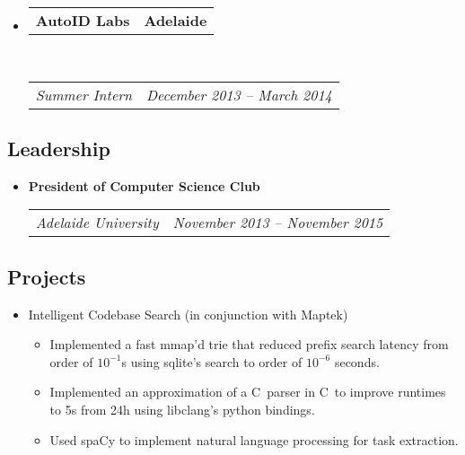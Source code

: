 \documentclass[10pt,letterpaper]{article}
\makeatletter
\newcommand{\headerrow}[2]
{\begin{tabular*}{\linewidth}{l@{\extracolsep{\fill}}r}
  #1 &
  #2 \\
\end{tabular*}}
\newcommand{\CPP}
{C\nolinebreak[4]\hspace{-.05em}\raisebox{.22ex}{\footnotesize\bf ++}}
\makeatother
\begin{document}
\begin{itemize}
  \item
  \headerrow
    {\textbf{AutoID Labs}}
    {\textbf{Adelaide}}
  \\
  \headerrow
    {\emph{Summer Intern}}
    {\emph{December 2013 -- March 2014}}

\end{itemize}

\subsection*{Leadership}

\begin{itemize}
  \parskip=0.1em
  \item
  {\textbf{President of Computer Science Club}}
  \\
  \headerrow
    {\emph{Adelaide University}}
    {\emph{November 2013 -- November 2015}}

\end{itemize}

\subsection*{Projects}
\begin{itemize}
\item Intelligent Codebase Search (in conjunction with Maptek)
  \begin{itemize}
    \item Implemented a fast mmap'd trie that reduced prefix search latency
          from order of $10^{-1}$s using sqlite's search to order of $10^{-6}$
          seconds.
    \item Implemented an approximation of a \CPP\ parser in \CPP\ to improve
          runtimes to 5s from 24h using libclang's python bindings.
    \item Used spaCy to implement natural language processing for
          task extraction.
  \end{itemize}
\end{itemize}
\end{document}
